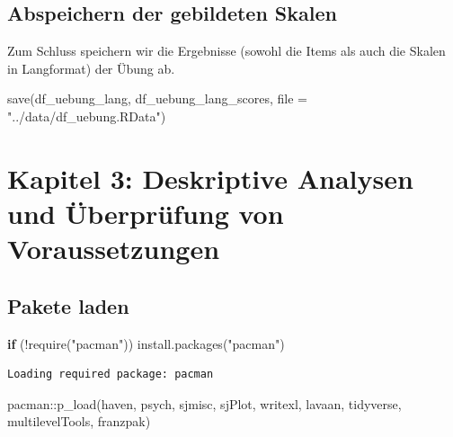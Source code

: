 \documentclass[
  letterpaper,
  DIV=11,
  numbers=noendperiod]{scrreprt}
\newenvironment{Shaded}{\begin{snugshade}}{\end{snugshade}}
\newcommand{\AttributeTok}[1]{\textcolor[rgb]{0.40,0.45,0.13}{#1}}
\newcommand{\ControlFlowTok}[1]{\textcolor[rgb]{0.00,0.23,0.31}{\textbf{#1}}}
\newcommand{\FunctionTok}[1]{\textcolor[rgb]{0.28,0.35,0.67}{#1}}
\newcommand{\NormalTok}[1]{\textcolor[rgb]{0.00,0.23,0.31}{#1}}
\newcommand{\SpecialCharTok}[1]{\textcolor[rgb]{0.37,0.37,0.37}{#1}}
\newcommand{\StringTok}[1]{\textcolor[rgb]{0.13,0.47,0.30}{#1}}
\begin{document}
\section{Abspeichern der gebildeten
Skalen}\label{abspeichern-der-gebildeten-skalen}

Zum Schluss speichern wir die Ergebnisse (sowohl die Items als auch die
Skalen in Langformat) der Übung ab.

\begin{Shaded}
\begin{Highlighting}[]
\FunctionTok{save}\NormalTok{(df\_uebung\_lang, df\_uebung\_lang\_scores, }\AttributeTok{file =} \StringTok{"../data/df\_uebung.RData"}\NormalTok{)}
\end{Highlighting}
\end{Shaded}


\chapter{Kapitel 3: Deskriptive Analysen und Überprüfung von
Voraussetzungen}\label{kapitel-3-deskriptive-analysen-und-uxfcberpruxfcfung-von-voraussetzungen}

\section{Pakete laden}\label{pakete-laden}

\begin{Shaded}
\begin{Highlighting}[]
\ControlFlowTok{if}\NormalTok{ (}\SpecialCharTok{!}\FunctionTok{require}\NormalTok{(}\StringTok{"pacman"}\NormalTok{)) }\FunctionTok{install.packages}\NormalTok{(}\StringTok{"pacman"}\NormalTok{)}
\end{Highlighting}
\end{Shaded}

\begin{verbatim}
Loading required package: pacman
\end{verbatim}

\begin{Shaded}
\begin{Highlighting}[]
\NormalTok{pacman}\SpecialCharTok{::}\FunctionTok{p\_load}\NormalTok{(haven, psych,}
\NormalTok{               sjmisc, sjPlot, writexl, lavaan,}
\NormalTok{               tidyverse, multilevelTools, franzpak)}
\end{Highlighting}
\end{Shaded}
\end{document}
